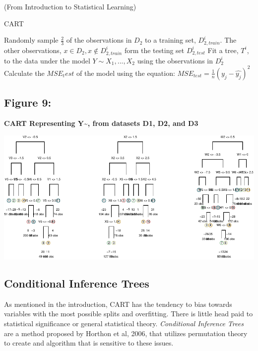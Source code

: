 \documentclass[12pt,twoside]{reedthesis}
\begin{document}
  (From Introduction to Statistical Learning)
  
  \begin{algorithm}
  \caption{CART}
  \label{cart}
  \begin{algorithmic}[1]
  \State Randomly sample $\frac 2 3$  of the observations in  $D_2$  to a training set,  $D_{2, train}^i$. The other observations,  $x \in D_2, x \notin D_{2, train}^i$ form the testing set $D_{2, test}^i$
  \State Fit a tree, $T^i$, to the data under the model $Y \sim X_1,...,X_2$ using the observations in      $D_{2}^i$
  \State Calculate the $MSE_test$ of the model using the equation:
      $MSE_{test} = \frac 1 n (y_j - \hat{y_j})^2$
  \EndFor
  \end{algorithmic}
  \end{algorithm}
  
  \subsection{Figure 9:}\label{figure-9}
  
  \textbf{CART Representing Y\textasciitilde{}, from datasets D1, D2, and
  D3}
  
  \begin{center}\includegraphics{Thesis_files/figure-latex/fig9-1} \end{center}
  
  \subsection{Conditional Inference
  Trees}\label{conditional-inference-trees}
  
  As mentioned in the introduction, CART has the tendency to bias towards
  variables with the most possible splits and overfitting. There is little
  head paid to statistical significance or general statistical theory.
  \emph{Conditional Inference Trees} are a method proposed by Horthon et
  al, 2006, that utilizes permutation theory to create and algorithm that
  is sensitive to these issues.
  
\end{document}
